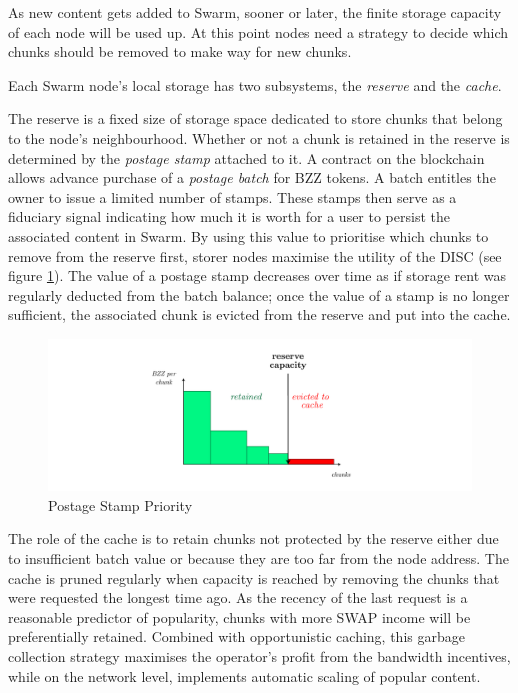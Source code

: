 \documentclass[12pt,a4paper]{article}
\begin{document}
As new content gets added to Swarm, sooner or later, the finite storage capacity of each node will be used up. At this point nodes need a strategy to decide which chunks should be removed to make way for new chunks. 

Each Swarm node’s local storage has two subsystems, the \emph{reserve} and the \emph{cache}.


The reserve is a fixed size of storage space dedicated to store chunks that belong to the node's neighbourhood. Whether or not a chunk is retained in the reserve is determined by the \emph{postage stamp} attached to it. A contract on the blockchain allows advance purchase of a \emph{postage batch} for BZZ tokens. A batch entitles the owner to issue a limited number of stamps. These stamps then serve as a fiduciary signal indicating how much it is worth for a user to persist the associated content in Swarm. 
By using this value to prioritise which chunks to remove from the reserve first, storer nodes maximise the utility of the DISC (see figure \ref{fig:postage-stamps}). 
The value of a postage stamp decreases over time as if storage rent was regularly deducted from the batch balance; once the value of a stamp is no longer sufficient, the associated chunk is evicted from the reserve and put into the cache. 

\begin{figure}[!ht]
  \centering
    \includegraphics[width=\textwidth]{fig2/reserve-capacity-2.pdf}
  \caption[Postage Stamp Priority]{Postage Stamp Priority}
\label{fig:postage-stamps}
\end{figure}    


The role of the cache is to retain chunks not protected by the reserve either due to insufficient batch value or because they are too far from the node address. The cache is pruned regularly when capacity is reached by removing the chunks that were requested the longest time ago. As the recency of the last request is a reasonable predictor of popularity, chunks with more SWAP income will be preferentially retained. Combined with opportunistic caching, this garbage collection strategy maximises the operator's profit from the bandwidth incentives, while on the network level, implements automatic scaling of popular content.
\end{document}
